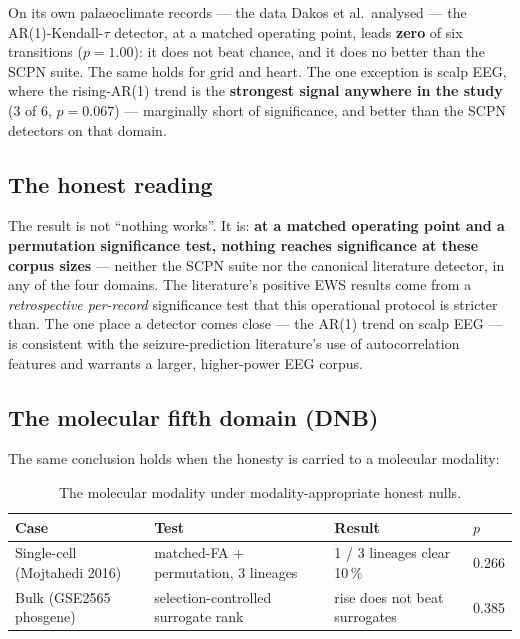 \documentclass[11pt]{article}
\begin{document}
On its own palaeoclimate records --- the data Dakos et al.\ analysed ---
the AR(1)-Kendall-$\tau$ detector, at a matched operating point, leads
\textbf{zero} of six transitions ($p = 1.00$): it does not beat chance,
and it does no better than the SCPN suite. The same holds for grid and
heart. The one exception is scalp EEG, where the rising-AR(1) trend is
the \textbf{strongest signal anywhere in the study} (3 of 6,
$p = 0.067$) --- marginally short of significance, and better than the
SCPN detectors on that domain.

\subsection{The honest reading}

The result is not ``nothing works''. It is: \textbf{at a matched
operating point and a permutation significance test, nothing reaches
significance at these corpus sizes} --- neither the SCPN suite nor the
canonical literature detector, in any of the four domains. The
literature's positive EWS results come from a \emph{retrospective
per-record} significance test that this operational protocol is stricter
than. The one place a detector comes close --- the AR(1) trend on scalp
EEG --- is consistent with the seizure-prediction literature's use of
autocorrelation features and warrants a larger, higher-power EEG corpus.

\subsection{The molecular fifth domain (DNB)}\label{sec:dnb}

The same conclusion holds when the honesty is carried to a molecular
modality:

\begin{table}[h!]
\centering
\footnotesize
\setlength{\tabcolsep}{4pt}
\begin{tabular}{llll}
\toprule
Case & Test & Result & $p$ \\
\midrule
Single-cell (Mojtahedi 2016) & matched-FA + permutation, 3 lineages & 1 / 3 lineages clear 10\,\% & 0.266 \\
Bulk (GSE2565 phosgene) & selection-controlled surrogate rank & rise does not beat surrogates & 0.385 \\
\bottomrule
\end{tabular}
\caption{The molecular modality under modality-appropriate honest nulls.}
\end{table}
\end{document}

